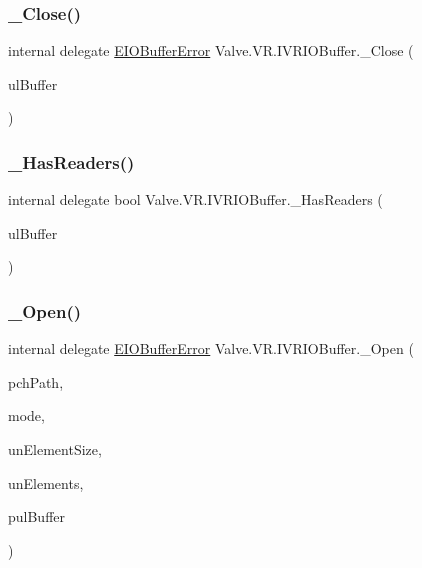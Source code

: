\subsubsection{\texorpdfstring{\_Close()}{\_Close()}}
{\footnotesize\ttfamily internal delegate \mbox{\hyperlink{namespace_valve_1_1_v_r_a11d6c73dbb80923b10779c007bb8c154}{E\+I\+O\+Buffer\+Error}} Valve.\+V\+R.\+I\+V\+R\+I\+O\+Buffer.\+\_\+\+Close (\begin{DoxyParamCaption}\item[{ulong}]{ul\+Buffer }\end{DoxyParamCaption})}

\mbox{\label{struct_valve_1_1_v_r_1_1_i_v_r_i_o_buffer_a6a33628dafbef18c06553fe1ba31e8cc}} 
\subsubsection{\texorpdfstring{\_HasReaders()}{\_HasReaders()}}
{\footnotesize\ttfamily internal delegate bool Valve.\+V\+R.\+I\+V\+R\+I\+O\+Buffer.\+\_\+\+Has\+Readers (\begin{DoxyParamCaption}\item[{ulong}]{ul\+Buffer }\end{DoxyParamCaption})}

\mbox{\label{struct_valve_1_1_v_r_1_1_i_v_r_i_o_buffer_a95ed10b524750552d8ae33a0ed369da2}} 
\subsubsection{\texorpdfstring{\_Open()}{\_Open()}}
{\footnotesize\ttfamily internal delegate \mbox{\hyperlink{namespace_valve_1_1_v_r_a11d6c73dbb80923b10779c007bb8c154}{E\+I\+O\+Buffer\+Error}} Valve.\+V\+R.\+I\+V\+R\+I\+O\+Buffer.\+\_\+\+Open (\begin{DoxyParamCaption}\item[{string}]{pch\+Path,  }\item[{\mbox{\hyperlink{namespace_valve_1_1_v_r_a59487dd6eb3684570995a3bea405db2e}{E\+I\+O\+Buffer\+Mode}}}]{mode,  }\item[{uint}]{un\+Element\+Size,  }\item[{uint}]{un\+Elements,  }\item[{ref ulong}]{pul\+Buffer }\end{DoxyParamCaption})}

